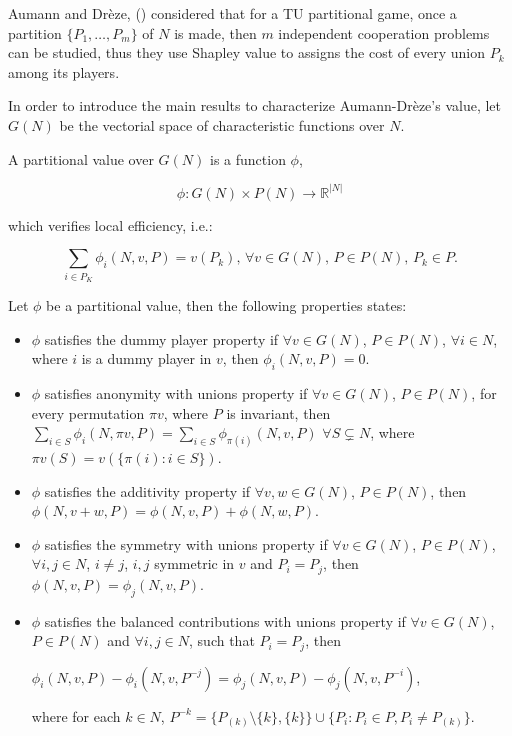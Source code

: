 Aumann and Dr\`eze, (\cite{Aumann}) considered that for a TU partitional game, once a partition $\{P_1,\dots,P_m\}$ of $N$ is made, then $m$ independent cooperation problems can be studied, thus they use Shapley value to assigns the cost of every union $P_k$ among its players. 

In order to introduce the main results to characterize Aumann-Dr\`eze's value, let $G(N)$ be the vectorial space of characteristic functions over $N$. 

\begin{definition}
	A partitional value over $G(N)$ is a function $\phi$,
	
	$$\phi:G(N) \times P(N) \rightarrow \mathbb{R}^{|N|} $$
	
	which verifies local efficiency, i.e.:
	
	$$\sum_{i \in P_K}\phi_{i}(N,v,P)=v(P_k) \text{, }\forall v \in G(N) \text{, } P \in P(N) \text{, } P_k \in P.$$	
\end{definition}

Let $\phi$ be a partitional value, then the following properties states:
\begin{itemize}
	\item $\phi$ satisfies the dummy player property if $\forall v \in G(N)$, $P\in P(N)$, $\forall i \in N$, where $i$ is a dummy player in $v$, then $\phi_i(N,v,P)=0$.
	\item $\phi$ satisfies anonymity with unions property if $\forall v \in G(N)$, $P\in P(N)$, for every permutation $ \pi v$, where $P$ is invariant, then
	$\sum_{i \in S}\phi_{i}(N,\pi v, P)= \sum_{i \in S} \phi_{\pi (i)}(N,v,P)$ $\forall S \subsetneq N$, where $\pi v(S)= v( \{ \pi (i): i \in S\})$.
	\item $\phi$ satisfies the additivity property if $\forall v,w \in G(N)$, $P\in P(N)$, then 
	$\phi(N,v+w, P) = \phi(N,v,P) + \phi(N,w,P)$.
	\item $\phi$ satisfies the symmetry with unions property if $\forall v \in G(N)$, $P\in P(N)$, $\forall i,j \in N$, $i \ne j$, $i,j$ symmetric in $v$ and $P_{i} = P_{j}$, then 
	$\phi(N,v,P) = \phi_{j} (N,v,P)$.
	\item $\phi$ satisfies the balanced contributions with unions property if $\forall v \in G(N)$, $P\in P(N)$ and $\forall i,j \in N$, such that $P_i = P_j$, then
	
	$\phi_{i}(N,v,P) - \phi_{i}(N,v,P^{-j}) = \phi_{j}(N,v,P) - \phi_{j}(N,v,P^{-i})$, 
	
	where for each $k \in N$,
	$P^{-k}=\{ P_{(k)}  \setminus \{k\}, \{k\} \} \cup \{P_{i} : P_{i} \in P, P_{i} \ne P_{(k)} \}  $.
\end{itemize}


